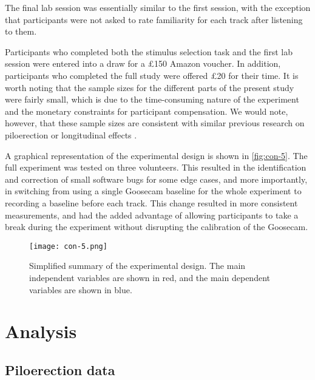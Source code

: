 The final lab session was essentially similar to the first session, with the exception that participants were not asked to rate familiarity for each track after listening to them.

Participants who completed both the stimulus selection task and the first lab session were entered into a draw for a \pounds150 Amazon voucher. In addition, participants who completed the full study were offered \pounds20 for their time. It is worth noting that the sample sizes for the different parts of the present study were fairly small, which is due to the time-consuming nature of the experiment and the monetary constraints for participant compensation. We would note, however, that these sample sizes are consistent with similar previous research on piloerection or longitudinal effects \parencite[e.g.,][]{bannister2018,madison2017,wassiliwizky2017a}.

A graphical representation of the experimental design is shown in \autoref{fig:con-5}. The full experiment was tested on three volunteers. This resulted in the identification and correction of small software bugs for some edge cases, and more importantly, in switching from using a single Goosecam baseline for the whole experiment to recording a baseline before each track. This change resulted in more consistent measurements, and had the added advantage of allowing participants to take a break during the experiment without disrupting the calibration of the Goosecam.

\begin{figure}[t!]
\texttt{[image: con-5.png]}
\centering
\caption{Simplified summary of the experimental design. The main independent variables are shown in red, and the main dependent variables are shown in blue.}
\label{fig:con-5}
\end{figure}

\section{Analysis}

\subsection{Piloerection data}

